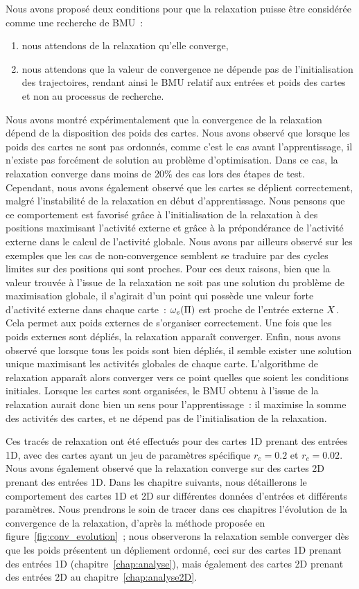 \documentclass[../main]{subfiles}
\begin{document}
Nous avons proposé deux conditions pour que la relaxation puisse être considérée comme une recherche de BMU~: 
\begin{enumerate}
	\item nous attendons de la relaxation qu'elle converge,
	\item nous attendons que la valeur de convergence ne dépende pas de l'initialisation des trajectoires, rendant ainsi le BMU relatif aux entrées et poids des cartes et non au processus de recherche.
\end{enumerate}

Nous avons montré expérimentalement que la convergence de la relaxation dépend de la disposition des poids des cartes. Nous avons observé que lorsque les poids des cartes ne sont pas ordonnés, comme c'est le cas avant l'apprentissage, il n'existe pas forcément de solution au problème d'optimisation. 
Dans ce cas, la relaxation converge dans moins de 20\% des cas lors des étapes de test.
Cependant, nous avons également observé que les cartes se déplient correctement, malgré l'instabilité de la relaxation en début d'apprentissage. Nous pensons que ce comportement est favorisé grâce à l'initialisation de la relaxation à des positions maximisant l'activité externe et grâce à la prépondérance de l'activité externe dans le calcul de l'activité globale. Nous avons par ailleurs observé sur les exemples que les cas de non-convergence semblent se traduire par des cycles limites sur des positions qui sont proches. 
Pour ces deux raisons, bien que la valeur trouvée à l'issue de la relaxation ne soit pas une solution du problème de maximisation globale, il s'agirait d'un point qui possède une valeur forte d'activité externe dans chaque carte~: $\omega_e(\Pi)$ est proche de l'entrée externe $X$. Cela permet aux poids externes de s'organiser correctement. Une fois que les poids externes sont dépliés, la relaxation apparaît converger.
Enfin, nous avons observé que lorsque tous les poids sont bien dépliés, il semble exister une solution unique maximisant les activités globales de chaque carte. L'algorithme de relaxation apparaît alors converger vers ce point quelles que soient les conditions initiales.
Lorsque les cartes sont organisées, le BMU obtenu à l'issue de la relaxation aurait donc bien un sens pour l'apprentissage~: il maximise la somme des activités des cartes, et ne dépend pas de l'initialisation de la relaxation.


Ces tracés de relaxation ont été effectués pour des cartes 1D prenant des entrées 1D, avec des cartes ayant un jeu de paramètres spécifique $r_e = 0.2$ et $r_c = 0.02$. Nous avons également observé que la relaxation converge sur des cartes 2D prenant des entrées 1D.
Dans les chapitre suivants, nous détaillerons le comportement des cartes 1D et 2D sur différentes données d'entrées et différents paramètres. Nous prendrons le soin de tracer dans ces chapitres l'évolution de la convergence de la relaxation, d'après la méthode proposée en figure~\ref{fig:conv_evolution}~; nous observerons la relaxation semble converger dès que les poids présentent un dépliement ordonné, ceci sur des cartes 1D prenant des entrées 1D (chapitre~\ref{chap:analyse}), mais également des cartes 2D prenant des entrées 2D au chapitre~\ref{chap:analyse2D}.

\ifSubfilesClassLoaded{
    \printbibliography
}{}
\end{document}
